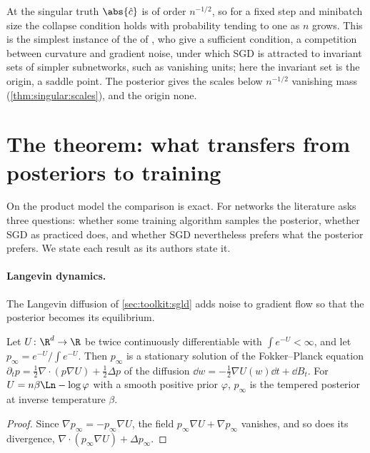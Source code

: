 \begin{refsection}
At the singular truth $\abs{\hat c}$ is of order $n^{-1/2}$, so for a fixed step and minibatch size the collapse condition holds with probability tending to one as $n$ grows. This is the simplest instance of the  of \textcite{ChenEtAl2023b}, who give a sufficient condition, a competition between curvature and gradient noise, under which SGD is attracted to invariant sets of simpler subnetworks, such as vanishing units; here the invariant set is the origin, a saddle point. The posterior gives the scales below $n^{-1/2}$ vanishing mass (\cref{thm:singular:scales}), and the origin none.

\section{The theorem: what transfers from posteriors to training}\label{sec:sgd:transfer}

On the product model the comparison is exact. For networks the literature asks three questions: whether some training algorithm samples the posterior, whether SGD as practiced does, and whether SGD nevertheless prefers what the posterior prefers. We state each result as its authors state it.

\paragraph{Langevin dynamics.} The Langevin diffusion of \cref{sec:toolkit:sgld} adds noise to gradient flow so that the posterior becomes its equilibrium.

\begin{proposition}\label{prop:sgd:langevin}
Let $U\colon\R^d\to\R$ be twice continuously differentiable with $\int e^{-U}<\infty$, and let $p_\infty=e^{-U}/\int e^{-U}$. Then $p_\infty$ is a stationary solution of the Fokker--Planck equation $\partial_tp=\frac12\nabla\cdot(p\nabla U)+\frac12\Delta p$ of the diffusion $\dd w=-\frac12\nabla U(w)\dd t+\dd B_t$. For $U=n\beta\Ln-\log\varphi$ with a smooth positive prior $\varphi$, $p_\infty$ is the tempered posterior at inverse temperature $\beta$.
\end{proposition}

\begin{proof}
Since $\nabla p_\infty=-p_\infty\nabla U$, the field $p_\infty\nabla U+\nabla p_\infty$ vanishes, and so does its divergence, $\nabla\cdot(p_\infty\nabla U)+\Delta p_\infty$.
\end{proof}


\end{refsection}
